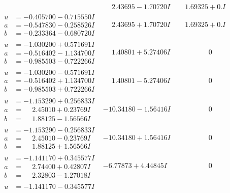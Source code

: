 \documentclass[1p]{elsarticle_modified}
\theoremstyle{definition}
\begin{document}
$$\begin{array}{c|c|c}
 & \phantom{-}2.43695 - 1.70720 I & \phantom{-}1.69325 + 0. I\phantom{ +0.000000I} \\ \hline\begin{aligned}
u &= -0.405700 - 0.715550 I \\
a &= -0.547830 - 0.258526 I \\
b &= -0.233364 - 0.680720 I\end{aligned}
 & \phantom{-}2.43695 + 1.70720 I & \phantom{-}1.69325 + 0. I\phantom{ +0.000000I} \\ \hline\begin{aligned}
u &= -1.030200 + 0.571691 I \\
a &= -0.516402 - 1.134700 I \\
b &= -0.985503 - 0.722266 I\end{aligned}
 & \phantom{-}1.40801 + 5.27406 I & \phantom{-0.000000 } 0 \\ \hline\begin{aligned}
u &= -1.030200 - 0.571691 I \\
a &= -0.516402 + 1.134700 I \\
b &= -0.985503 + 0.722266 I\end{aligned}
 & \phantom{-}1.40801 - 5.27406 I & \phantom{-0.000000 } 0 \\ \hline\begin{aligned}
u &= -1.153290 + 0.256833 I \\
a &= \phantom{-}2.45010 + 0.23769 I \\
b &= \phantom{-}1.88125 - 1.56566 I\end{aligned}
 & -10.34180 - 1.56416 I & \phantom{-0.000000 } 0 \\ \hline\begin{aligned}
u &= -1.153290 - 0.256833 I \\
a &= \phantom{-}2.45010 - 0.23769 I \\
b &= \phantom{-}1.88125 + 1.56566 I\end{aligned}
 & -10.34180 + 1.56416 I & \phantom{-0.000000 } 0 \\ \hline\begin{aligned}
u &= -1.141170 + 0.345577 I \\
a &= \phantom{-}2.74400 + 0.42807 I \\
b &= \phantom{-}2.32803 - 1.27018 I\end{aligned}
 & -6.77873 + 4.44845 I & \phantom{-0.000000 } 0 \\ \hline\begin{aligned}
u &= -1.141170 - 0.345577 I \\

\end{aligned}
\end{array}$$
\end{document}
